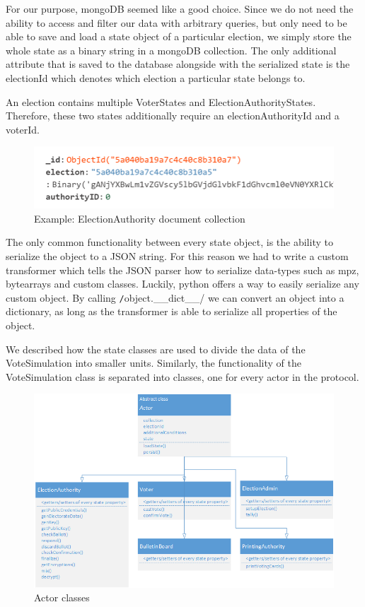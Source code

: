 For our purpose, mongoDB seemed like a good choice. Since we do not need the ability to access and filter our data with arbitrary queries, but only need to be able to save and load a state object of a particular election, we simply store the whole state as a binary string in a mongoDB collection. The only additional attribute that is saved to the database alongside with the serialized state is the electionId which denotes which election a particular state belongs to. 

An election contains multiple VoterStates and ElectionAuthorityStates. Therefore, these two states additionally require an electionAuthorityId and a voterId.

\begin{figure}[h!]
\begin{center}
\includegraphics[scale=0.62]{assets/db.png}
\caption{Example: ElectionAuthority document collection}
\end{center}
\end{figure}

The only common functionality between every state object, is the ability to serialize the object to a JSON string. For this reason we had to write a custom transformer which tells the JSON parser how to serialize data-types such as mpz, bytearrays and custom classes. Luckily, python offers a way to easily serialize any custom object. By calling \texttt/object.__dict__/ we can convert an object into a dictionary, as long as the transformer is able to serialize all properties of the object.

We described how the state classes are used to divide the data of the VoteSimulation into smaller units. Similarly, the functionality of the VoteSimulation class is separated into classes, one for every actor in the protocol.

\begin{figure}[h!]
\begin{center}
\includegraphics[scale=0.75]{assets/actorClasses.png}
\caption{Actor classes}
\end{center}
\end{figure}

